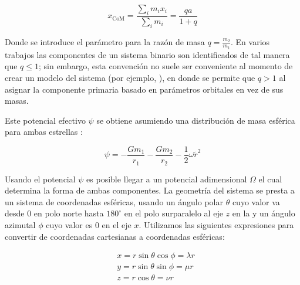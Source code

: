 \begin{eqfloat}[!ht]
	\centering
	\begin{equation}
		x_{\textrm{CoM}} = \frac{\sum_{i}{m_i x_i}}{\sum_{i}{m_i}} = \frac{qa}{1 + q}
	\end{equation}
	\blankcaption
	\label{ecuacionCentroDeMasa}
\end{eqfloat}

Donde se introduce el parámetro para la razón de masa $q = \frac{m_2}{m_1}$. En
varios trabajos las componentes de un sistema binario son identificados de tal
manera que $q \leq 1$; sin embargo, esta convención no suele ser conveniente al
momento de crear un modelo del sistema (por ejemplo,
), en donde se permite que $q >
1$ al asignar la componente primaria basado en parámetros orbitales en vez de
sus masas.

Este potencial efectivo $\psi$ se obtiene asumiendo una distribución de masa
esférica para ambas estrellas :

\begin{eqfloat}[!ht]
	\centering
	\begin{equation}
		\psi = -\frac{G m_1}{r_1} - \frac{G m_2}{r_2} - \frac{1}{2} \omega \tilde{r}^2
	\end{equation}
	\blankcaption
	\label{ecuacionPotencialEfectivo}
\end{eqfloat}

Usando el potencial $\psi$ es posible llegar a un potencial adimensional
$\Omega$ el cual determina la forma de ambas componentes. La geometría del
sistema se presta a un sistema de coordenadas esféricas, usando un ángulo polar
$\theta$ cuyo valor va desde $0$ en polo norte hasta $180^{\circ}$ en el polo
sur\textemdash paralelo al eje $z$ en la
\textemdash y un ángulo azimutal $\phi$ cuyo valor
es $0$ en el eje $x$. Utilizamos las siguientes expresiones para convertir de
coordenadas cartesianas a coordenadas esféricas:

\begin{eqfloat}[!ht]
	\centering
	\begin{equation}
		\begin{split}
			& x = r \sin{\theta} \cos{\phi} = \lambda r \\
			& y = r \sin{\theta} \sin{\phi} = \mu r \\
			& z = r \cos{\theta} = \nu r
		\end{split}
	\end{equation}
	\blankcaption
	\label{ecuacionesCoordsEsfericasConversion}
\end{eqfloat}

